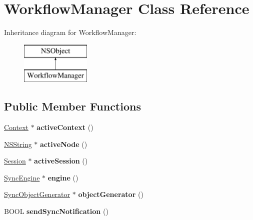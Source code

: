 \hypertarget{interface_workflow_manager}{
\section{\-Workflow\-Manager \-Class \-Reference}
\label{interface_workflow_manager}
}
\-Inheritance diagram for \-Workflow\-Manager\-:\begin{figure}[H]
\begin{center}
\leavevmode
\includegraphics[height=2.000000cm]{interface_workflow_manager}
\end{center}
\end{figure}
\subsection*{\-Public \-Member \-Functions}
\begin{DoxyCompactItemize}
\item 
\hypertarget{interface_workflow_manager_a48b4a3909eaf8969b5676e52da63a514}{
\hyperlink{interface_context}{\-Context} $\ast$ {\bfseries active\-Context} ()}
\label{interface_workflow_manager_a48b4a3909eaf8969b5676e52da63a514}

\item 
\hypertarget{interface_workflow_manager_a6e656573bf5c5b3da41dc8ba6311f69e}{
\hyperlink{class_n_s_string}{\-N\-S\-String} $\ast$ {\bfseries active\-Node} ()}
\label{interface_workflow_manager_a6e656573bf5c5b3da41dc8ba6311f69e}

\item 
\hypertarget{interface_workflow_manager_a773cb478e9b67a50f0bf1ce5218be365}{
\hyperlink{interface_session}{\-Session} $\ast$ {\bfseries active\-Session} ()}
\label{interface_workflow_manager_a773cb478e9b67a50f0bf1ce5218be365}

\item 
\hypertarget{interface_workflow_manager_a227229236b70c9ac0e6135a236f6d360}{
\hyperlink{interface_sync_engine}{\-Sync\-Engine} $\ast$ {\bfseries engine} ()}
\label{interface_workflow_manager_a227229236b70c9ac0e6135a236f6d360}

\item 
\hypertarget{interface_workflow_manager_a003c2fe4553cdabf8caa187b35680956}{
\hyperlink{interface_sync_object_generator}{\-Sync\-Object\-Generator} $\ast$ {\bfseries object\-Generator} ()}
\label{interface_workflow_manager_a003c2fe4553cdabf8caa187b35680956}

\item 
\hypertarget{interface_workflow_manager_a7f2e42026223b1322dd24d5bc30c3acb}{
\-B\-O\-O\-L {\bfseries send\-Sync\-Notification} ()}
\label{interface_workflow_manager_a7f2e42026223b1322dd24d5bc30c3acb}

\end{DoxyCompactItemize}
